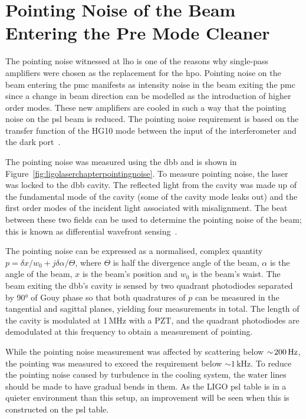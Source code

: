 \section{Pointing Noise of the Beam Entering the Pre Mode Cleaner}
The pointing noise witnessed at \gls{lho} is one of the reasons why single-pass amplifiers were chosen as the replacement for the \gls{hpo}. Pointing noise on the beam entering the \gls{pmc} manifests as intensity noise in the beam exiting the \gls{pmc} since a change in beam direction can be modelled as the introduction of higher order modes. These new amplifiers are cooled in such a way that the pointing noise on the \gls{psl} beam is reduced. The pointing noise requirement is based on the transfer function of the HG10 mode between the input of the interferometer and the dark port~\cite{PSL_pointing_requirement}.
\par
The pointing noise was measured using the \gls{dbb} and is shown in Figure~\ref{fig:ligolaserchapterpointingnoise}. To measure pointing noise, the laser was locked to the \gls{dbb} cavity. The reflected light from the cavity was made up of the fundamental mode of the cavity (some of the cavity mode leaks out) and the first order modes of the incident light associated with misalignment. The beat between these two fields can be used to determine the pointing noise of the beam; this is known as differential wavefront sensing~\cite{Morrison1994}.
\par
The pointing noise can be expressed as a normalised, complex quantity $p = \delta x/w_0 + j\delta\alpha/\Theta$, where $\Theta$ is half the divergence angle of the beam, $\alpha$ is the angle of the beam, $x$ is the beam's position and $w_0$ is the beam's waist. The beam exiting the \gls{dbb}'s cavity is sensed by two quadrant photodiodes separated by \ang{90} of Gouy phase so that both quadratures of $p$ can be measured in the tangential and sagittal planes, yielding four measurements in total. The length of the cavity is modulated at 1\,MHz with a PZT, and the quadrant photodiodes are demodulated at this frequency to obtain a measurement of pointing.
\par
While the pointing noise measurement was affected by scattering below $\sim\!200\,\rm{Hz}$, the pointing was measured to exceed the requirement below $\sim\!1\,\si{\kilo\hertz}$. To reduce the pointing noise caused by turbulence in the cooling system, the water lines should be made to have gradual bends in them. As the LIGO \gls{psl} table is in a quieter environment than this setup, an improvement will be seen when this is constructed on the \gls{psl} table.
